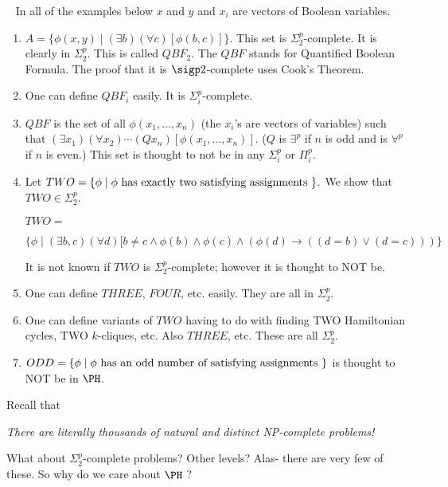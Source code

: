 \documentclass[12pt]{article}
\begin{document}
\begin{example}~
In all of the examples below $x$ and $y$ and $x_i$ are vectors of Boolean variables.
\begin{enumerate}
\item
$A=\{ \phi(x,y) \mid  (\exists b)(\forall c)[\phi(b,c)]\}$.
This set is $\Sigma_2^p$-complete.
It is clearly in $\Sigma_2^p$.
This is called $QBF_2$. The $QBF$ stands for Quantified Boolean Formula.
The proof that it is $\sigp 2$-complete uses Cook's Theorem.
\item
One can define $QBF_i$ easily. It is $\Sigma_i^p$-complete.
\item
$QBF$ is the set of all $\phi(x_1,\ldots, x_n)$
(the $x_i$'s are vectors of variables) such that
$(\exists x_1)(\forall x_2)\cdots (Q x_n)[\phi(x_1,\ldots,x_n)]$.
($Q$ is $\exists^p$ if $n$ is odd and is $\forall^p$ if $n$ is even.)
This set is thought to not be in any $\Sigma_i^p$ or $\Pi_i^p$.
\item
Let
$TWO = \{ \phi \mid \phi \hbox{ has exactly two satisfying assignments } \}.$
We show that $TWO\in \Sigma_2^p$.

$TWO =$

$
\{\phi\mid (\exists b,c)(\forall d)[b\ne c\wedge \phi(b)\wedge\phi(c)\wedge(\phi(d)\rightarrow 
((d=b)\vee(d=c)))\}
$

It is not known if $TWO$ is $\Sigma_2^p$-complete; however it is thought
to NOT be.

\item
One can define $THREE$, $FOUR$, etc. easily.
They are all in $\Sigma_2^p$.

\item
One can define variants of $TWO$ having to do with finding TWO Hamiltonian
cycles, TWO $k$-cliques, etc. Also $THREE$, etc.
These are all $\Sigma_2^p$.

\item
$ODD = \{ \phi \mid \phi \hbox{ has an odd number of satisfying assignments }\}$
is thought to NOT be in $\PH$.

\end{enumerate}

\end{example}

Recall that

{\it There are literally thousands of natural and distinct NP-complete problems!}

What about $\Sigma_2^p$-complete problems? Other levels?
Alas- there are very few of these.
So why do we care about $\PH$ ?
\end{document}
